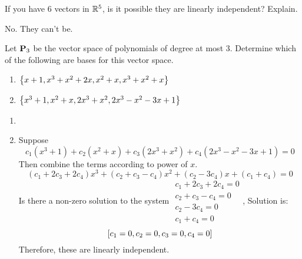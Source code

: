 \begin{ex}
  If you have $6$ vectors in $\mathbb{R}^{5}$, is it possible they are
  linearly independent? Explain.
  \begin{sol}
    No. They can't be.
  \end{sol}
\end{ex}

\begin{ex}
  Let $\mathbf{P}_3$ be the vector space of polynomials of degree at most
  3. Determine which of the following are bases for this vector space.

  \begin{enumerate}
  \item $\left\{x+1,x^{3}+x^{2}+2x,x^{2}+x,x^{3}+x^{2}+x\right\} $

  \item $\left\{x^{3}+1,x^{2}+x,2x^{3}+x^{2},2x^{3}-x^{2}-3x+1\right\} $
  \end{enumerate}

  \begin{sol}
    \begin{enumerate}
    \item
    \item
      Suppose
      \begin{equation*}
        c_{1}(x^{3}+1) +c_{2}(x^{2}+x) +c_{3}(
        2x^{3}+x^{2}) +c_{4}(2x^{3}-x^{2}-3x+1) =0
      \end{equation*}
      Then combine the terms according to power of $x$.
      \begin{equation*}
        (c_{1}+2c_{3}+2c_{4}) x^{3}+(c_{2}+c_{3}-c_{4})
        x^{2}+(c_{2}-3c_{4}) x+(c_{1}+c_{4}) =0
      \end{equation*}
      Is there a non-zero solution to the system $
      \begin{array}{c}
        c_{1}+2c_{3}+2c_{4}=0 \\
        c_{2}+c_{3}-c_{4}=0 \\
        c_{2}-3c_{4}=0 \\
        c_{1}+c_{4}=0
      \end{array}
      $, Solution is:
      \begin{equation*}
        \left[c_{1}=0,c_{2}=0,c_{3}=0,c_{4}=0\right]
      \end{equation*}
      Therefore, these are linearly independent.
    \end{enumerate}
  \end{sol}
\end{ex}

